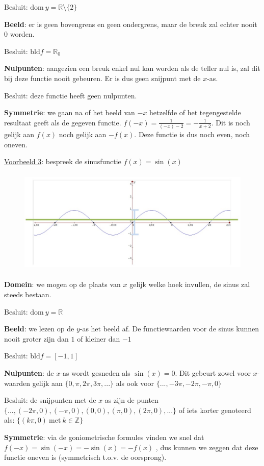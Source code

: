\noindent Besluit: $\textrm{dom}\:y=\mathbb{R}\setminus\{2\}$ 

\medskip{}


\noindent \textbf{Beeld}: er is geen bovengrens en geen ondergrens,
maar de breuk zal echter nooit $0$ worden.

\noindent Besluit: $\textrm{bld}f=\mathbb{R}_{0}$

\medskip{}


\noindent \textbf{Nulpunten}: aangezien een breuk enkel nul kan worden
als de teller nul is, zal dit bij deze functie nooit gebeuren. Er
is dus geen snijpunt met de $x$-as.

\noindent Besluit: deze functie heeft geen nulpunten.

\medskip{}


\noindent \textbf{Symmetrie}: we gaan na of het beeld van $-x$ hetzelfde
of het tegengestelde resultaat geeft als de gegeven functie. $f(-x)=\frac{1}{(-x)-2}=-\frac{1}{x+2}$.
Dit is noch gelijk aan $f(x)$ noch gelijk aan $-f(x)$. Deze functie
is dus noch even, noch oneven.

\noindent \bigskip{}


\noindent \uline{Voorbeeld 3}: bespreek de sinusfunctie $f(x)=\sin(x)$ 

\begin{figure}[h]
	\centering{}\includegraphics[height=5cm]{2_elem_rekenvaardigheden_B/inputs/reeel_vb3.jpg} 
\end{figure}


\noindent \textbf{Domein}: we mogen op de plaats van $x$ gelijk welke
hoek invullen, de sinus zal steeds bestaan.

\noindent Besluit: $\textrm{dom}\:y=\mathbb{R}$ 

\medskip{}


\noindent \textbf{Beeld}: we lezen op de $y$-as het beeld af. De
functiewaarden voor de sinus kunnen nooit groter zijn dan $1$ of
kleiner dan $-1$

\noindent Besluit: $\textrm{bld}f=[-1,1]$

\medskip{}


\noindent \textbf{Nulpunten}: de $x$-as wordt gesneden als $\sin(x)=0$.
Dit gebeurt zowel voor $x$-waarden gelijk aan $\{0,\pi,2\pi,3\pi,...\}$
als ook voor $\{...,-3\pi,-2\pi,-\pi,0\}$

\noindent Besluit: de snijpunten met de $x$-as zijn de punten $\{...,(-2\pi,0),(-\pi,0),(0,0),(\pi,0),(2\pi,0),...\}$
of iets korter genoteerd als: $\{(k\pi,0)\:\textrm{met}\:k\in\mathbb{Z}\}$

\medskip{}


\noindent \textbf{Symmetrie}: via de goniometrische formules vinden
we snel dat $f(-x)=\sin(-x)=-\sin(x)=-f(x)$ , dus kunnen we zeggen
dat deze functie oneven is (symmetrisch t.o.v. de oorsprong).
